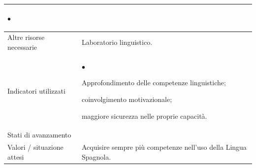\documentclass[12pt,a4paper,oneside]{memoir}
\newenvironment{elenco}{\begin{list}{$\bullet$}{%
              \setlength{\leftmargin}{4mm}%
              \setlength{\rightmargin}{1mm}%
               \setlength{\itemindent}{0mm}%
               \setlength{\labelwidth}{2mm}%
               \setlength{\labelsep}{2mm}%
              \setlength{\itemsep}{-\parsep}%
              \setlength{\partopsep}{0pt}%
              \setlength{\topsep}{0pt}%
             \setlength{\parskip}{0pt}%
              }}{\end{list}}
\begin{document}
\begin{footnotesize}
\begin{longtable}{|>{\raggedright}p{2.5cm}|>{\raggedright\arraybackslash}P{10cm}|}
\begin{elenco}
\end{elenco}\\[-4mm] \hline
Altre risorse necessarie&Laboratorio linguistico.\\ \hline
Indicatori utilizzati&
\begin{elenco}
\item Approfondimento delle competenze linguistiche;
\item coinvolgimento motivazionale;
\item maggiore sicurezza nelle proprie capacità.
\end{elenco}\\[-4mm] \hline
Stati di avanzamento&\\ \hline
Valori / situazione attesi& Acquisire sempre più competenze nell'uso della Lingua Spagnola.\\ \hline
\end{longtable}
\end{footnotesize}

\clearpage
\end{document}

